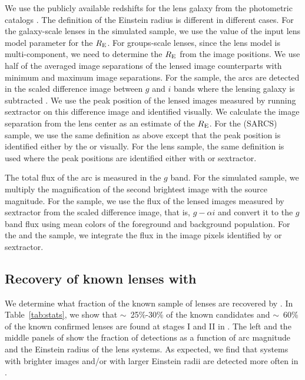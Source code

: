 \documentclass[useAMS,usenatbib,a4paper]{mn2e}
\begin{document}
We use the publicly available redshifts for the lens galaxy from the
\cfhtls photometric catalogs \citep{Coupon2009}. The definition of the
Einstein radius is different in different cases. For the galaxy-scale
lenses in the simulated sample, we use the value of the input lens model
parameter for the $R_{\rm E}$. For groups-scale lenses, since the lens
model is multi-component, we need to determine the $R_{\rm E}$ from the
image positions. We use half of the averaged image separations of the
lensed image counterparts with minimum and maximum image separations.
For the \rf sample, the arcs are detected in the scaled difference image
between $g$ and $i$ bands where the lensing galaxy is subtracted
\citep[for details, see]{Gavazzi2014}. We use the peak position of the
lensed images measured by running {\sc sextractor} on this difference
image and identified visually. We calculate the image separation from
the lens center as an estimate of the $R_{\rm E}$. For the \af (SARCS)
sample, we use the same definition as above except that the peak
position is identified either by the \af or visually. For the \sw lens
sample, the same definition is used where the peak positions are
identified either with \af or {\sc sextractor}. 

The total flux of the arc is measured in the $g$ band. For the simulated
sample, we multiply the magnification of the second brightest image with
the source magnitude. For the \rf sample, we use the flux of the lensed
images measured by {\sc sextractor} from the scaled difference image,
that is, $g-\alpha i$ and convert it to the $g$ band flux using mean
colors of the foreground and background population. For the \af and the
\sw sample, we integrate the flux in the image pixels identified by \af
or {\sc sextractor}. 


\subsection{Recovery of known \cfhtls lenses with \sw}
\label{sec:results:known}

We determine what fraction of the known sample of lenses are recovered by \sw. In
Table~\ref{tab:stats}, we show that $\sim$~25\%-30\% of the known
candidates and $\sim$~60\% of the known confirmed lenses are found at
stages I and II in \sw. The left and the middle panels of
 show the fraction of detections as a function of arc
magnitude and the Einstein radius of the lens systems. As expected, we
find that systems with brighter images and/or with larger Einstein radii
are detected more often in \sw. 
\end{document}
